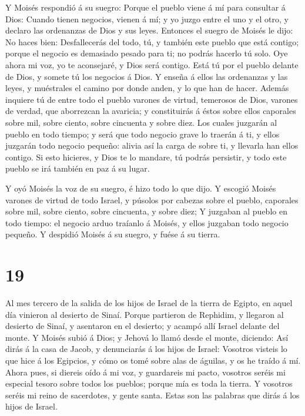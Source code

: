  Y Moisés respondió á su suegro: Porque el pueblo viene á
mí para consultar á Dios:  Cuando tienen negocios, vienen á
mí; y yo juzgo entre el uno y el otro, y declaro las ordenanzas de Dios
y sus leyes.  Entonces el suegro de Moisés le dijo: No
haces bien:  Desfallecerás del todo, tú, y también este
pueblo que está contigo; porque el negocio es demasiado pesado para ti;
no podrás hacerlo tú solo.  Oye ahora mi voz, yo te
aconsejaré, y Dios será contigo. Está tú por el pueblo delante de Dios,
y somete tú los negocios á Dios.  Y enseña á ellos las
ordenanzas y las leyes, y muéstrales el camino por donde anden, y lo que
han de hacer.  Además inquiere tú de entre todo el pueblo
varones de virtud, temerosos de Dios, varones de verdad, que aborrezcan
la avaricia; y constituirás á éstos sobre ellos caporales sobre mil,
sobre ciento, sobre cincuenta y sobre diez.  Los cuales
juzgarán al pueblo en todo tiempo; y será que todo negocio grave lo
traerán á ti, y ellos juzgarán todo negocio pequeño: alivia así la carga
de sobre ti, y llevarla han ellos contigo.  Si esto
hicieres, y Dios te lo mandare, tú podrás persistir, y todo este pueblo
se irá también en paz á su lugar.

 Y oyó Moisés la voz de su suegro, é hizo todo lo que dijo.
 Y escogió Moisés varones de virtud de todo Israel, y
púsolos por cabezas sobre el pueblo, caporales sobre mil, sobre ciento,
sobre cincuenta, y sobre diez;  Y juzgaban al pueblo en
todo tiempo: el negocio arduo traíanlo á Moisés, y ellos juzgaban todo
negocio pequeño.  Y despidió Moisés á su suegro, y fuése á
su tierra.

\hypertarget{section-18}{%
\section{19}\label{section-18}}

 Al mes tercero de la salida de los hijos de Israel de la
tierra de Egipto, en aquel día vinieron al desierto de Sinaí.
 Porque partieron de Rephidim, y llegaron al desierto de
Sinaí, y asentaron en el desierto; y acampó allí Israel delante del
monte.  Y Moisés subió á Dios; y Jehová lo llamó desde el
monte, diciendo: Así dirás á la casa de Jacob, y denunciarás á los hijos
de Israel:  Vosotros visteis lo que hice á los Egipcios, y
cómo os tomé sobre alas de águilas, y os he traído á mí. 
Ahora pues, si diereis oído á mi voz, y guardareis mi pacto, vosotros
seréis mi especial tesoro sobre todos los pueblos; porque mía es toda la
tierra.  Y vosotros seréis mi reino de sacerdotes, y gente
santa. Estas son las palabras que dirás á los hijos de Israel.

